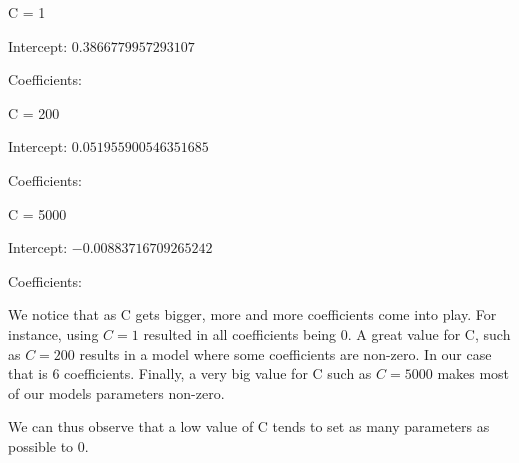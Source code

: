 \documentclass[10pt]{article}
\begin{document}
\vspace{5mm} %

C = 1
\par
Intercept: $0.3866779957293107$
\par
Coefficients:
\begin{equation*}
    [0, 0, 0, 0, -0, -0, 0, 0, 0, 0, 0, -0, 0, -0, -0, 0, 0, 0, 0, 0, 0]    
\end{equation*}

\vspace{5mm} %

C = 200
\par
Intercept: $0.051955900546351685$
\par
Coefficients:
\begin{equation*}
    [ 0, -0.00314985, 0.96742042, 0.87629499, -0.00654177, 0.00630364, 
\end{equation*}
\begin{equation*}
    -0, 0, -0, 0, 0.06296949, -0, 0, -0, 0,-0, 0,-0, 0, -0, -0]    
\end{equation*}

\vspace{5mm} %

C = 5000
\par
Intercept: $-0.00883716709265242$
\par
Coefficients:
\begin{equation*}
    [ 0, 0, 1.00631362, 0.88266399, -0.07027632, 0.23958815,
\end{equation*}
\begin{equation*}
    0.30758898, 0,-0.44969477, -0.0277997, 0.14749331, -0.00335293,
\end{equation*}
\begin{equation*}
    -0.10920998, 0.05252247, -0.15571219, -0.36071504, 0.19936564,
\end{equation*}
\begin{equation*}
    0.22193872, -0.22696517, 0.32680584, -0.]
\end{equation*}


We notice that as C gets bigger, more and more coefficients come into play.
For instance, using $C=1$ resulted in all coefficients being 0. A great value for C,
such as $C = 200$ results in a model where some coefficients are non-zero. In our case that is
6 coefficients. Finally, a very big value for C such as $C = 5000$ makes most of our models
parameters non-zero.

We can thus observe that a low value of C tends to set as many parameters as possible to 0.
\end{document}
